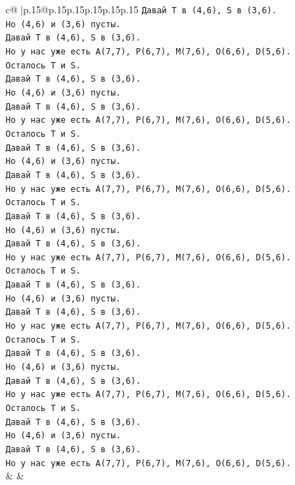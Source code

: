 \documentclass{article}
\begin{document}
{\begin{supertabular}{c@{$\;$}|p{.15\linewidth}@{}p{.15\linewidth}p{.15\linewidth}p{.15\linewidth}p{.15\linewidth}p{.15\linewidth}}
{{{\texttt{Давай T в (4,6), S в (3,6).} \\
\texttt{Но (4,6) и (3,6) пусты.} \\
\texttt{Давай T в (4,6), S в (3,6).} \\
\texttt{Но у нас уже есть A(7,7), P(6,7), M(7,6), O(6,6), D(5,6).} \\
\texttt{Осталось T и S.} \\
\texttt{Давай T в (4,6), S в (3,6).} \\
\texttt{Но (4,6) и (3,6) пусты.} \\
\texttt{Давай T в (4,6), S в (3,6).} \\
\texttt{Но у нас уже есть A(7,7), P(6,7), M(7,6), O(6,6), D(5,6).} \\
\texttt{Осталось T и S.} \\
\texttt{Давай T в (4,6), S в (3,6).} \\
\texttt{Но (4,6) и (3,6) пусты.} \\
\texttt{Давай T в (4,6), S в (3,6).} \\
\texttt{Но у нас уже есть A(7,7), P(6,7), M(7,6), O(6,6), D(5,6).} \\
\texttt{Осталось T и S.} \\
\texttt{Давай T в (4,6), S в (3,6).} \\
\texttt{Но (4,6) и (3,6) пусты.} \\
\texttt{Давай T в (4,6), S в (3,6).} \\
\texttt{Но у нас уже есть A(7,7), P(6,7), M(7,6), O(6,6), D(5,6).} \\
\texttt{Осталось T и S.} \\
\texttt{Давай T в (4,6), S в (3,6).} \\
\texttt{Но (4,6) и (3,6) пусты.} \\
\texttt{Давай T в (4,6), S в (3,6).} \\
\texttt{Но у нас уже есть A(7,7), P(6,7), M(7,6), O(6,6), D(5,6).} \\
\texttt{Осталось T и S.} \\
\texttt{Давай T в (4,6), S в (3,6).} \\
\texttt{Но (4,6) и (3,6) пусты.} \\
\texttt{Давай T в (4,6), S в (3,6).} \\
\texttt{Но у нас уже есть A(7,7), P(6,7), M(7,6), O(6,6), D(5,6).} \\
\texttt{Осталось T и S.} \\
\texttt{Давай T в (4,6), S в (3,6).} \\
\texttt{Но (4,6) и (3,6) пусты.} \\
\texttt{Давай T в (4,6), S в (3,6).} \\
\texttt{Но у нас уже есть A(7,7), P(6,7), M(7,6), O(6,6), D(5,6).} \\
            }
        }
    }
    & & \\ \\


\end{supertabular}}
\end{document}
